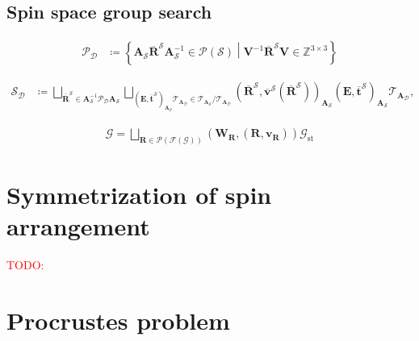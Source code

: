 \documentclass[a4paper, 11pt]{article}
\theoremstyle{definition}
\newcommand{\todo}[1]{\textcolor{red}{TODO: #1}}
\newcommand{\relmiddle}[1]{\mathrel{}\middle#1\mathrel{}}
\newcommand{\set}[2]{\left\{ #1 \relmiddle| #2 \right\}}
\begin{document}
\subsection{Spin space group search}

\begin{align}
  \mathcal{P}_{\mathcal{D}}
    &\coloneqq \set{
        \bm{A}_{\mathcal{S}} \overline{\bm{R}}^{\mathcal{S}} \bm{A}_{\mathcal{S}}^{-1} \in \mathcal{P}(\mathcal{S})
      }{
        \bm{V}^{-1} \overline{\bm{R}}^{\mathcal{S}} \bm{V} \in \mathbb{Z}^{3 \times 3}
      }
\end{align}

\begin{align}
  \mathcal{S}_{\mathcal{D}}
    &\coloneqq \bigsqcup_{
          \overline{\bm{R}}^{\mathcal{S}} \in \bm{A}_{\mathcal{S}}^{-1} \mathcal{P}_{\mathcal{D}} \bm{A}_{\mathcal{S}}
      } \bigsqcup_{
          \left( \bm{E}, \overline{ \bm{t} }^{\mathcal{S}} \right)_{ \bm{A}_{\mathcal{S}} } \mathcal{T}_{\bm{A}_{\mathcal{D}}}
          \in \mathcal{T}_{\bm{A}_{\mathcal{S}}} / \mathcal{T}_{\bm{A}_{\mathcal{D}}}
      }
      \left(
        \overline{\bm{R}}^{\mathcal{S}},
        \overline{ \bm{v} }^{\mathcal{S}}(\overline{\bm{R}}^{\mathcal{S}})
      \right)_{ \bm{A}_{\mathcal{S}} }
      \left( \bm{E}, \overline{ \bm{t} }^{\mathcal{S}} \right)_{ \bm{A}_{\mathcal{S}} }
      \mathcal{T}_{\bm{A}_{\mathcal{D}}},
\end{align}

\begin{align}
  \mathcal{G}
    = \bigsqcup_{ \bm{R} \in \mathcal{P}(\mathcal{F}(\mathcal{G})) } (\bm{W}_{\bm{R}}, (\bm{R}, \bm{v}_{\bm{R}})) \mathcal{G}_{\mathrm{st}}
\end{align}

\section{Symmetrization of spin arrangement}

\todo{}

\appendix

\section{\label{appx:procrustes}Procrustes problem}
\end{document}
